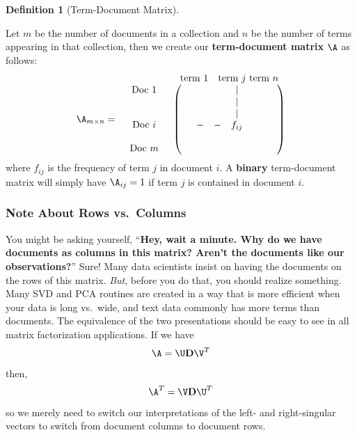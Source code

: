 \documentclass[
]{article}
\theoremstyle{definition}
\newtheorem{definition}{Definition}[section]
\theoremstyle{definition}
\theoremstyle{definition}
\theoremstyle{definition}
\theoremstyle{remark}
\begin{document}
\begin{definition}[Term-Document Matrix]
\protect\hypertarget{def:tdm}{}\label{def:tdm}

Let \(m\) be the number of documents in a collection and \(n\) be the number of terms appearing in that collection, then we create our \textbf{term-document matrix} \(\A\) as follows:
\begin{equation}
    \begin{array}{ccc}
        & & \text{term 1} \quad \text{term $j$} \,\, \text{term $n$} \\
        \A_{m\times n} = & \begin{array}{c}
            \hbox{Doc 1} \\
            \\
            \\
            \hbox{Doc $i$} \\
            \\
            \hbox{Doc $m$} \\
        \end{array} &
        \left(
        \begin{array}{ccccccc}
            & & & |&  & & \\
            & & & |&  & & \\
            & & & |&  & & \\
            & - & - &f_{ij}  &  & & \\
            & & & & & & \\
            & & & & & & \\
        \end{array}
        \right)
    \end{array}
\nonumber
\end{equation}
where \(f_{ij}\) is the frequency of term \(j\) in document \(i\). A \textbf{binary} term-document matrix will simply have \(\A_{ij}=1\) if term \(j\) is contained in document \(i\).

\end{definition}

\hypertarget{note-about-rows-vs.-columns}{%
\subsubsection{Note About Rows vs.~Columns}\label{note-about-rows-vs.-columns}}

You might be asking yourself, ``\textbf{Hey, wait a minute. Why do we have documents as columns in this matrix? Aren't the documents like our observations?}'' Sure! Many data scientists insist on having the documents on the rows of this matrix. \emph{But}, before you do that, you should realize something. Many SVD and PCA routines are created in a way that is more efficient when your data is long vs.~wide, and text data commonly has more terms than documents. The equivalence of the two presentations should be easy to see in all matrix factorization applications. If we have
\[\A = \U\mathbf{D}\V^T\] then,
\[\A^T = \V\mathbf{D}\U^T\]
so we merely need to switch our interpretations of the left- and right-singular vectors to switch from document columns to document rows.
\end{document}
